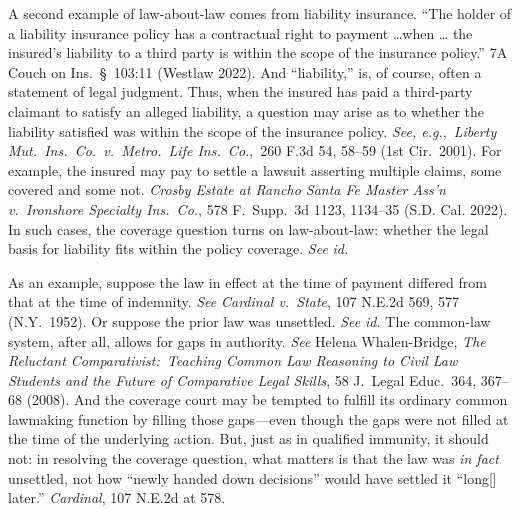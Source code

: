 \documentclass[
  12pt,
  letterpaper,
]{scrartcl}
\begin{document}
A second example of law-about-law comes from liability insurance. ``The holder
of a liability insurance policy has a contractual right to payment \ldots when \ldots
the insured's liability to a third party is within the scope of the insurance
policy.'' 7A Couch on Ins.~§~103:11 (Westlaw 2022). And ``liability,'' is, of course, often a statement of legal judgment. Thus, when the insured has paid a
third-party claimant to satisfy an alleged liability, a question may
arise as to whether the liability satisfied was within the scope of the insurance
policy. \textit{See, e.g.},~\textit{Liberty Mut.~Ins.~Co.~v.~Metro.~Life
Ins.~Co.},~260 F.3d 54, 58--59 (1st Cir.~2001). For example, the insured may
pay to settle a lawsuit asserting multiple claims, some covered and some not.
\textit{Crosby Estate at Rancho Santa Fe Master Ass'n v.~Ironshore Specialty
Ins.~Co.}, 578 F.~Supp.~3d 1123, 1134--35 (S.D. Cal. 2022). In such cases, the
coverage question turns on law-about-law: whether the legal basis for liability
fits within the policy coverage. \textit{See} \textit{id.}

As an example, suppose the law in effect at the time of payment differed from that at the time of indemnity. \textit{See} \textit{Cardinal v.~State}, 107
N.E.2d 569, 577 (N.Y.~1952). Or suppose the prior law was unsettled.
\textit{See} \textit{id.} The common-law system, after all, allows for gaps in authority.
\textit{See} Helena Whalen-Bridge, \textit{The Reluctant
Comparativist:~Teaching Common Law Reasoning to Civil Law Students and the
Future of Comparative Legal Skills}, 58 J.~Legal Educ.~364, 367--68 (2008). And the coverage court may be tempted to fulfill its ordinary common
lawmaking function by filling those gaps---even though the gaps were not filled at the time of the underlying action. But, just as in qualified immunity, it should not: in resolving the coverage question, what matters is
that the law was \textit{in fact} unsettled, not how ``newly handed down decisions''
would have settled it ``long[] later.'' \textit{Cardinal}, 107 N.E.2d at
578.
\end{document}
